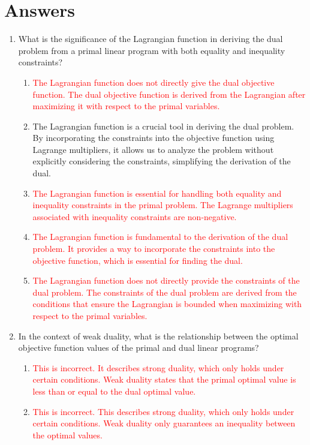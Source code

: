 \documentclass{article}%
\newcommand{\incorrect}[1]{\textcolor{red}{#1}}
\begin{document}
\section{Answers}%
\label{sec:Answers}%
\begin{enumerate}%
\item What is the significance of the Lagrangian function in deriving the dual problem from a primal linear program with both equality and inequality constraints?%
\begin{enumerate}%
\item \incorrect{The Lagrangian function does not directly give the dual objective function.  The dual objective function is derived from the Lagrangian after maximizing it with respect to the primal variables.}%
\item The Lagrangian function is a crucial tool in deriving the dual problem. By incorporating the constraints into the objective function using Lagrange multipliers, it allows us to analyze the problem without explicitly considering the constraints, simplifying the derivation of the dual.%
\item \incorrect{The Lagrangian function is essential for handling both equality and inequality constraints in the primal problem.  The Lagrange multipliers associated with inequality constraints are non-negative.}%
\item \incorrect{The Lagrangian function is fundamental to the derivation of the dual problem.  It provides a way to incorporate the constraints into the objective function, which is essential for finding the dual.}%
\item \incorrect{The Lagrangian function does not directly provide the constraints of the dual problem. The constraints of the dual problem are derived from the conditions that ensure the Lagrangian is bounded when maximizing with respect to the primal variables.}%
\end{enumerate}%
\vspace{1em}%
\item In the context of weak duality, what is the relationship between the optimal objective function values of the primal and dual linear programs?%
\begin{enumerate}%
\item \incorrect{This is incorrect.  It describes strong duality, which only holds under certain conditions. Weak duality states that the primal optimal value is less than or equal to the dual optimal value.}%
\item \incorrect{This is incorrect. This describes strong duality, which only holds under certain conditions. Weak duality only guarantees an inequality between the optimal values.}%

\end{enumerate}
\end{enumerate}
\end{document}
